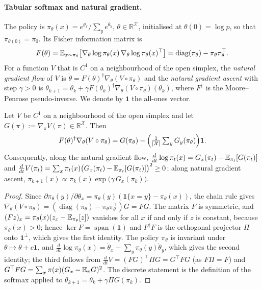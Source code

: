\paragraph{Tabular softmax and natural gradient.}
The policy is $\pi_\theta(x)=e^{\theta_x}/\sum_{y}e^{\theta_y}$,
$\theta\in\mathbb R^{\mathcal X}$, initialised at $\theta(0)=\log p$, so
that $\pi_{\theta(0)}=\pi_0$. Its Fisher information matrix is
\[
F(\theta)=\mathbb{E}_{x\sim\pi_\theta}\bigl[\nabla_\theta\log\pi_\theta(x)\,
\nabla_\theta\log\pi_\theta(x)^{\top}\bigr]
=\operatorname{diag}(\pi_\theta)-\pi_\theta\pi_\theta^{\top}.
\]
For a
function $V$ that is $C^1$ on a neighbourhood of the open simplex, the
\emph{natural gradient flow} of $V$ is
$\dot\theta=F(\theta)^{\dagger}\nabla_\theta (V\circ\pi_\theta)$ and the
\emph{natural gradient ascent} with step $\gamma>0$ is
$\theta_{k+1}=\theta_k+\gamma F(\theta_k)^{\dagger}\nabla_\theta
(V\circ\pi_{\theta})(\theta_k)$, where $F^\dagger$ is the Moore--Penrose
pseudo-inverse. We denote by $\mathbf 1$ the all-ones vector.

\begin{lemma}
\label{lem:npg-softmax}
Let $V$ be $C^1$ on a neighbourhood of the open simplex and let
$G(\pi):=\nabla_\pi V(\pi)\in\mathbb R^{\mathcal X}$. Then
\[
F(\theta)^{\dagger}\nabla_\theta (V\circ\pi_\theta)
= G(\pi_\theta)-\Bigl(\tfrac{1}{|\mathcal X|}\textstyle\sum_y G_y(\pi_\theta)\Bigr)\mathbf 1 .
\]
Consequently, along the natural gradient flow,
$\frac{d}{dt}\log\pi_t(x)=G_x(\pi_t)-\mathbb{E}_{\pi_t}[G(\pi_t)]$ and
$\frac{d}{dt}V(\pi_t)=\sum_x\pi_t(x)\bigl(G_x(\pi_t)-\mathbb{E}_{\pi_t}[G(\pi_t)]\bigr)^2\ge 0$;
along natural gradient ascent,
$\pi_{k+1}(x)\propto\pi_k(x)\exp\bigl(\gamma\,G_x(\pi_k)\bigr)$.
\end{lemma}

\begin{proof}
Since $\partial\pi_\theta(y)/\partial\theta_x=\pi_\theta(y)(\mathbf 1\{x=y\}-\pi_\theta(x))$,
the chain rule gives
$\nabla_\theta(V\circ\pi_\theta)=(\operatorname{diag}(\pi_\theta)-\pi_\theta\pi_\theta^\top)G=F G$.
The matrix $F$ is symmetric, and $(Fz)_x=\pi_\theta(x)(z_x-\mathbb{E}_{\pi_\theta}[z])$
vanishes for all $x$ if and only if $z$ is constant, because $\pi_\theta(x)>0$;
hence $\ker F=\operatorname{span}(\mathbf 1)$ and $F^\dagger F$ is the
orthogonal projector $\Pi$ onto $\mathbf 1^{\perp}$, which gives the first
identity. The policy $\pi_\theta$ is invariant under
$\theta\mapsto\theta+c\mathbf 1$, and
$\frac{d}{dt}\log\pi_\theta(x)=\dot\theta_x-\sum_y\pi_\theta(y)\dot\theta_y$,
which gives the second identity; the third follows from
$\frac{d}{dt}V=(FG)^\top\Pi G=G^\top F G$ (as $F\Pi=F$) and
$G^\top FG=\sum_x\pi(x)(G_x-\mathbb{E}_\pi G)^2$. The discrete statement is the
definition of the softmax applied to $\theta_{k+1}=\theta_k+\gamma\Pi G(\pi_k)$.
\end{proof}

